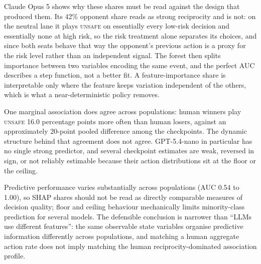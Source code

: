 \documentclass{article}
\newcommand{\Safe}{\textsc{safe}}
\newcommand{\Unsafe}{\textsc{unsafe}}
\begin{document}
Claude Opus 5 shows why these shares must be read against the design that
produced them. Its 42\% opponent share reads as strong reciprocity and is
not: on the neutral lane it plays \Unsafe{} on essentially every low-risk
decision and essentially none at high risk, so the risk treatment alone
separates its choices, and since both seats behave that way the opponent's
previous action is a proxy for the risk level rather than an independent
signal. The forest then splits importance between two variables encoding
the same event, and the perfect AUC describes a step function, not a better
fit. A feature-importance share is interpretable only where the feature
keeps variation independent of the others, which is what a
near-deterministic policy removes.

One marginal association does agree across populations: human winners
play \Unsafe{} 16.0 percentage points more often than human losers, against an
approximately 20-point pooled difference among the checkpoints. The dynamic
structure behind that agreement does not agree. GPT-5.4-nano in particular has
no single strong predictor, and several checkpoint estimates are weak,
reversed in sign, or not reliably estimable because their action distributions
sit at the floor or the ceiling.

Predictive performance varies substantially across populations (AUC 0.54
to 1.00), so SHAP shares should not be read as directly comparable measures
of decision quality; floor and ceiling behaviour mechanically limits
minority-class prediction for several models. The defensible
conclusion is narrower than ``LLMs use different features'': the same
observable state variables organise predictive information differently
across populations, and matching a human aggregate action rate does not
imply matching the human reciprocity-dominated association profile.



\end{document}

